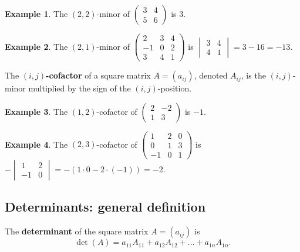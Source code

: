 \documentclass[
  12pt,
  oneside]{book}
\theoremstyle{definition}
\theoremstyle{definition}
\newtheorem{example}{Example}[chapter]
\theoremstyle{definition}
\theoremstyle{definition}
\theoremstyle{remark}
\begin{document}
\begin{example}
\protect\hypertarget{exm:unnamed-chunk-45}{}{\label{exm:unnamed-chunk-45} }The \((2,2)\)-minor of \(\begin{pmatrix}3&4\\5&6\end{pmatrix}\) is \(3\).
\end{example}
\begin{example}
\protect\hypertarget{exm:unnamed-chunk-46}{}{\label{exm:unnamed-chunk-46} }The \((2,1)\)-minor of \(\begin{pmatrix}2&3&4\\-1& 0 &2\\3&4&1\end{pmatrix}\) is \(\begin{vmatrix}3&4\\ 4&1\end{vmatrix}=3-16=-13\).
\end{example}

The \textbf{\((i,j)\)-cofactor} of a square matrix \(A=(a_{ij})\), denoted
\(A_{ij}\), is the \((i,j)\)-minor multiplied by the sign of the \((i,j)\)-position.

\begin{example}
\protect\hypertarget{exm:unnamed-chunk-47}{}{\label{exm:unnamed-chunk-47} }The \((1,2)\)-cofactor of \(\begin{pmatrix}2&-2\\1&3\end{pmatrix}\) is \(-1\).
\end{example}
\begin{example}
\protect\hypertarget{exm:unnamed-chunk-48}{}{\label{exm:unnamed-chunk-48} }The \((2,3)\)-cofactor of \(\begin{pmatrix}1&2&0\\0&1&3\\-1&0&1\end{pmatrix}\) is \(-\begin{vmatrix}1&2\\-1&0\end{vmatrix}=-(1\cdot0-2\cdot(-1))=-2\).
\end{example}

\hypertarget{determinants-general-definition}{%
\subsection{Determinants: general definition}\label{determinants-general-definition}}

The \textbf{determinant} of the square matrix \(A=(a_{ij})\) is
\[
\det(A) = a_{11}A_{11} + a_{12}A_{12} + \dots + a_{1n}A_{1n}.
\]
\end{document}
